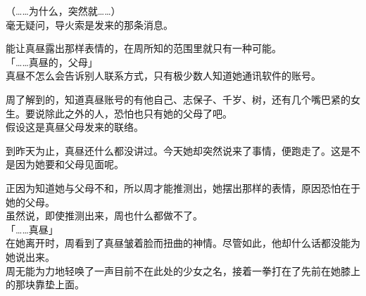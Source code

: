 （……为什么，突然就……）\\

毫无疑问，导火索是发来的那条消息。

能让真昼露出那样表情的，在周所知的范围里就只有一种可能。\\

「……真昼的，父母」\\

真昼不怎么会告诉别人联系方式，只有极少数人知道她通讯软件的账号。

周了解到的，知道真昼账号的有他自己、志保子、千岁、树，还有几个嘴巴紧的女生。要说除此之外的人，恐怕也只有她的父母了吧。\\

假设这是真昼父母发来的联络。

到昨天为止，真昼还什么都没讲过。今天她却突然说来了事情，便跑走了。这是不是因为她要和父母见面呢。

正因为知道她与父母不和，所以周才能推测出，她摆出那样的表情，原因恐怕在于她的父母。\\

虽然说，即使推测出来，周也什么都做不了。\\

「……真昼」\\

在她离开时，周看到了真昼皱着脸而扭曲的神情。尽管如此，他却什么话都没能为她说出来。\\

周无能为力地轻唤了一声目前不在此处的少女之名，接着一拳打在了先前在她膝上的那块靠垫上面。
